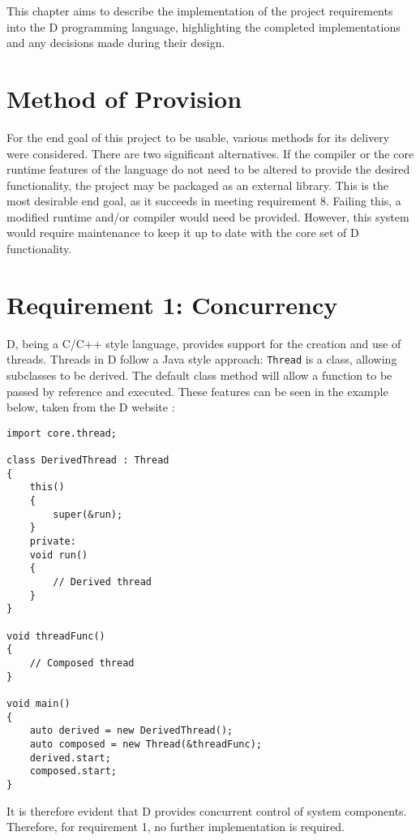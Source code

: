 %
%
%
This chapter aims to describe the implementation of the project requirements into the D
programming language, highlighting the completed implementations and any  
decisions made during their design.

\section{Method of Provision}
For the end goal of this project to be usable, various methods for its delivery 
were considered. There are two significant alternatives. 
If the compiler or the 
core runtime features of the language do not need to be altered to provide the 
desired functionality, the project may be packaged as an external library. 
This is the most desirable end goal, as it succeeds in meeting requirement 8. 
Failing this, a modified runtime and/or compiler would need be provided.
However, this system would require maintenance to keep it up to date with the
core set of D functionality. 

\section{Requirement 1: Concurrency}
D, being a C/C++ style language, provides support for the creation and use of 
threads. Threads in D follow a Java style approach: \texttt{Thread} is a class, 
allowing subclasses to be derived. The default 
class method will allow a function to be passed by reference and executed. 
These features can be seen in the example below, taken from the D website
\cite{core-thread}: 
\begin{lstlisting}[basicstyle=\small]
import core.thread; 

class DerivedThread : Thread
{
    this()
    {
        super(&run);
    }
    private:
    void run()
    {
        // Derived thread 
    }
}

void threadFunc()
{
    // Composed thread
}

void main()
{
    auto derived = new DerivedThread();
    auto composed = new Thread(&threadFunc);
    derived.start; 
    composed.start;
}
\end{lstlisting}
It is therefore evident that D provides 
concurrent control of system components. Therefore, for requirement 1, no
further implementation is required. 


